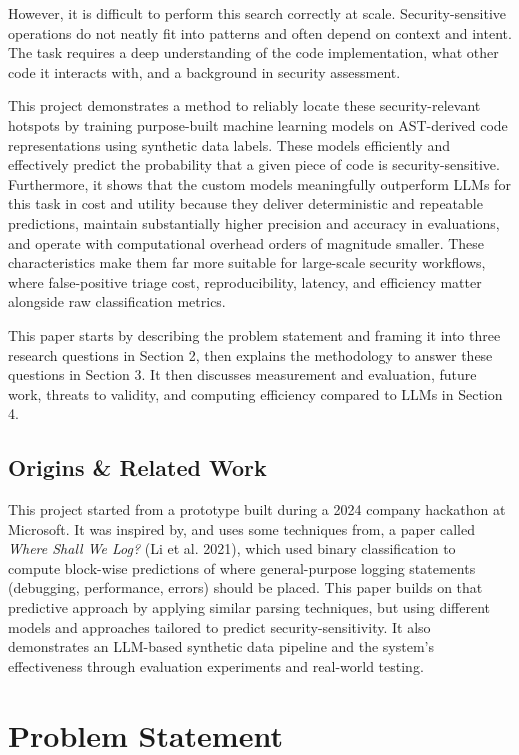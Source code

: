 \documentclass[11pt]{article}
\begin{document}
However, it is difficult to perform this search correctly at scale.
Security-sensitive operations do not neatly fit into patterns and often
depend on context and intent. The task requires a deep understanding of
the code implementation, what other code it interacts with, and a
background in security assessment.

This project demonstrates a method to reliably locate these
security-relevant hotspots by training purpose-built machine learning
models on AST-derived code representations using synthetic data labels.
These models efficiently and effectively predict the probability that a
given piece of code is security-sensitive. Furthermore, it shows that
the custom models meaningfully outperform LLMs for this task in cost
and utility because they deliver deterministic and repeatable
predictions, maintain substantially higher precision and accuracy in evaluations, and operate with computational overhead orders of magnitude
smaller. These characteristics make them far more suitable for
large-scale security workflows, where false-positive triage cost,
reproducibility, latency, and efficiency matter alongside raw
classification metrics.

This paper starts by describing the problem statement and framing it into three
research questions in Section 2, then explains the methodology to answer
these questions in Section 3. It then discusses measurement and evaluation,
future work, threats to validity, and computing efficiency compared to
LLMs in Section 4.

\subsection{Origins \& Related Work}\label{related-work}

This project started from a prototype built during a 2024 company
hackathon at Microsoft. It was inspired by, and uses some techniques
from, a paper called \emph{Where Shall We Log?} (Li et al. 2021), which
used binary classification to compute block-wise predictions of where
general-purpose logging statements (debugging, performance, errors)
should be placed. This paper builds on that predictive approach by applying
similar parsing techniques, but using different models and approaches
tailored to predict security-sensitivity. It also demonstrates an LLM-based
synthetic data pipeline and the system's effectiveness through evaluation 
experiments and real-world testing.

\section{Problem Statement}\label{problem-statement}
\end{document}
